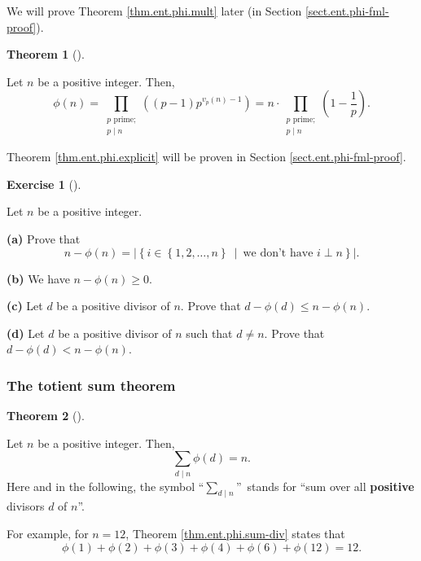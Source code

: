 \documentclass[numbers=enddot,12pt,final,onecolumn,notitlepage]{scrartcl}%
\newcounter{exer}
\numberwithin{exer}{subsection}
\theoremstyle{definition}
\newtheorem{theo}{Theorem}[subsection]
\newenvironment{theorem}[1][]
{\begin{theo}[#1]\begin{leftbar}}
{\end{leftbar}\end{theo}}
\newtheorem{exmp}[exer]{Exercise}
\newenvironment{exercise}[1][]
{\begin{exmp}[#1]\begin{leftbar}}
{\end{leftbar}\end{exmp}}
\let\sumnonlimits\sum
\let\prodnonlimits\prod
\renewcommand{\sum}{\sumnonlimits\limits}
\renewcommand{\prod}{\prodnonlimits\limits}
\begin{document}
We will prove Theorem \ref{thm.ent.phi.mult} later (in Section
\ref{sect.ent.phi-fml-proof}).

\begin{theorem}
\label{thm.ent.phi.explicit}Let $n$ be a positive integer. Then,%
\[
\phi\left(  n\right)  =\prod_{\substack{p\text{ prime;}\\p\mid n}}\left(
\left(  p-1\right)  p^{v_{p}\left(  n\right)  -1}\right)  =n\cdot
\prod_{\substack{p\text{ prime;}\\p\mid n}}\left(  1-\dfrac{1}{p}\right)  .
\]

\end{theorem}

Theorem \ref{thm.ent.phi.explicit} will be proven in Section
\ref{sect.ent.phi-fml-proof}.

\begin{exercise}
\label{exe.ent.phi.d-phid}Let $n$ be a positive integer.

\textbf{(a)} Prove that%
\[
n-\phi\left(  n\right)  =\left\vert \left\{  i\in\left\{  1,2,\ldots
,n\right\}  \ \mid\ \text{we don't have }i\perp n\right\}  \right\vert .
\]


\textbf{(b)} We have $n-\phi\left(  n\right)  \geq0$.

\textbf{(c)} Let $d$ be a positive divisor of $n$. Prove that $d-\phi\left(
d\right)  \leq n-\phi\left(  n\right)  $.

\textbf{(d)} Let $d$ be a positive divisor of $n$ such that $d\neq n$. Prove
that $d-\phi\left(  d\right)  <n-\phi\left(  n\right)  $.
\end{exercise}

\subsubsection{The totient sum theorem}

\begin{theorem}
\label{thm.ent.phi.sum-div}Let $n$ be a positive integer. Then,%
\[
\sum_{d\mid n}\phi\left(  d\right)  =n.
\]
Here and in the following, the symbol \textquotedblleft$\sum_{d\mid n}%
$\textquotedblright\ stands for \textquotedblleft sum over all
\textbf{positive} divisors $d$ of $n$\textquotedblright.
\end{theorem}

For example, for $n=12$, Theorem \ref{thm.ent.phi.sum-div} states that%
\[
\phi\left(  1\right)  +\phi\left(  2\right)  +\phi\left(  3\right)
+\phi\left(  4\right)  +\phi\left(  6\right)  +\phi\left(  12\right)  =12.
\]
\end{document}
